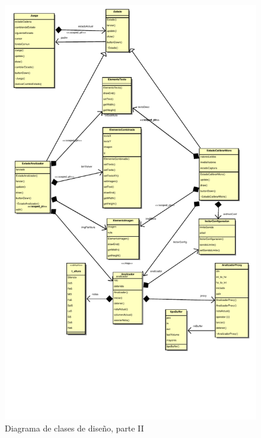 \begin{figure}[htp!]
  \centering
  \includegraphics[width=\textwidth, clip=true, trim=0cm 3.5cm 0cm 0cm]{5_diseno/diagrama2}
  \caption{Diagrama de clases de diseño, parte II}
  \label{fig:diagrama_clases_2}
\end{figure}

